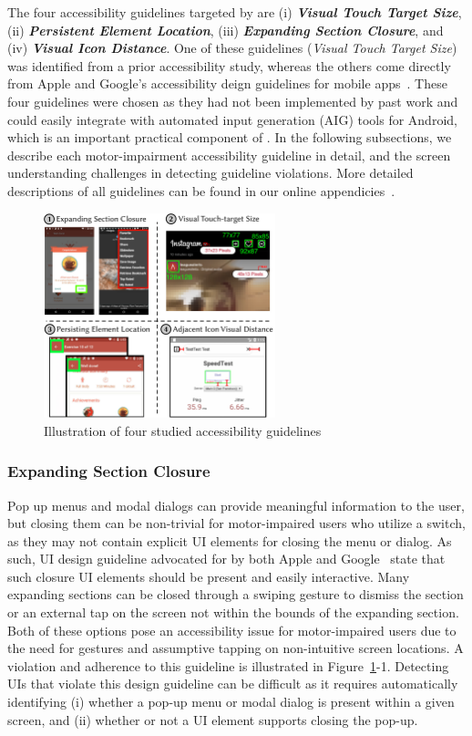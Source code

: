 The four accessibility guidelines targeted by \MotorEase are (i) \textit{\textbf{Visual Touch Target Size}}, (ii) \textit{\textbf{Persistent Element Location}}, (iii) \textit{\textbf{Expanding Section Closure}}, and (iv) \textit{\textbf{Visual Icon Distance}}. One of these guidelines (\textit{Visual Touch Target Size}) was identified from a prior accessibility study, whereas the others come directly from Apple and Google's accessibility deign guidelines for mobile apps~\cite{AppleAccess,GoogleAccess}. These four guidelines were chosen as they had not been implemented by past work and could easily integrate with automated input generation (AIG) tools for Android, which is an important practical component of \MotorEase.  
In the following subsections, we describe each motor-impairment accessibility guideline in detail, and the screen understanding challenges in detecting guideline violations. More detailed descriptions of all  guidelines can be found in our online appendicies~\cite{appendix,site,zenodo}.  

\begin{figure}[t]
    \centering
    \includegraphics[width=0.6\textwidth]{imgs/guidelines.pdf}
    \caption{Illustration of four studied accessibility guidelines}
    \label{AllDetectors}
\end{figure}


\subsubsection{Expanding Section Closure}
Pop up menus and modal dialogs can provide meaningful information to the user, but closing them can be non-trivial for motor-impaired users who utilize a switch, as they may not contain explicit UI elements for closing the menu or dialog. As such, UI design guideline advocated for by both Apple and Google~\cite{AppleAccess,GoogleAccess} state that such closure UI elements should be present and easily interactive. Many expanding sections can be closed through a swiping gesture to dismiss the section or an external tap on the screen not within the bounds of the expanding section. Both of these options pose an accessibility issue for motor-impaired users due to the need for gestures and assumptive tapping on non-intuitive screen locations. A violation and adherence to this guideline is illustrated in Figure~\ref{AllDetectors}-1. Detecting UIs that violate this design guideline can be difficult as it requires automatically identifying (i) whether a pop-up menu or modal dialog is present within a given screen, and (ii) whether or not a UI element supports closing the pop-up. 

